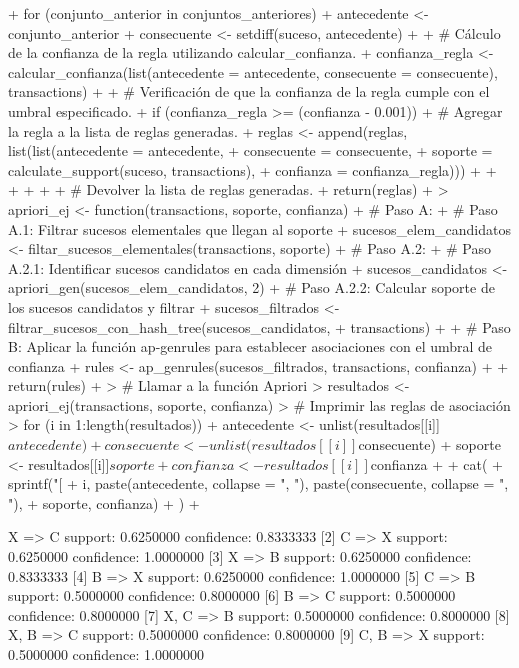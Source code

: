 \documentclass[a4paper, 12pt]{article}
\begin{document}
\begin{Schunk}
\begin{Sinput}
{{{+       for (conjunto_anterior in conjuntos_anteriores) {
+         antecedente <- conjunto_anterior
+         consecuente <- setdiff(suceso, antecedente)
+         
+         # Cálculo de la confianza de la regla utilizando calcular_confianza.
+         confianza_regla <- calcular_confianza(list(antecedente = antecedente, consecuente = consecuente), transactions)
+         
+         # Verificación de que la confianza de la regla cumple con el umbral especificado.
+         if (confianza_regla >= (confianza - 0.001)) {
+           # Agregar la regla a la lista de reglas generadas.
+           reglas <- append(reglas, list(list(antecedente = antecedente,
+                                              consecuente = consecuente,
+                                              soporte = calculate_support(suceso, transactions),
+                                              confianza = confianza_regla)))
+         }
+       }
+     }
+   }
+   
+   # Devolver la lista de reglas generadas.
+   return(reglas)
+ }
> apriori_ej <- function(transactions, soporte, confianza) {
+ 	# Paso A:
+ 	# Paso A.1: Filtrar sucesos elementales que llegan al soporte
+ 	sucesos_elem_candidatos <- filtar_sucesos_elementales(transactions, soporte)
+ 	# Paso A.2:
+ 		# Paso A.2.1: Identificar sucesos candidatos en cada dimensión
+ 		sucesos_candidatos <- apriori_gen(sucesos_elem_candidatos, 2)
+ 		# Paso A.2.2: Calcular soporte de los sucesos candidatos y filtrar
+ 		sucesos_filtrados <- filtrar_sucesos_con_hash_tree(sucesos_candidatos,
+ 		transactions)
+ 
+ 	# Paso B: Aplicar la función ap-genrules para establecer asociaciones con el umbral de confianza
+ 	rules <- ap_genrules(sucesos_filtrados, transactions, confianza)
+ 
+ 	return(rules)
+ }
> # Llamar a la función Apriori
> resultados <- apriori_ej(transactions, soporte, confianza)
> # Imprimir las reglas de asociación
> for (i in 1:length(resultados)) {
+ 	antecedente <- unlist(resultados[[i]]$antecedente)
+ 	consecuente <- unlist(resultados[[i]]$consecuente)
+ 	soporte <- resultados[[i]]$soporte
+ 	confianza <- resultados[[i]]$confianza
+ 	
+ 	cat(
+ 	sprintf("[%
+ 			i, paste(antecedente, collapse = ", "), paste(consecuente, collapse = ", "),
+ 			soporte, confianza)
+ 	)
+ }
\end{Sinput}
\begin{Soutput}
[1] {X} => {C}  support: 0.6250000  confidence: 0.8333333
[2] {C} => {X}  support: 0.6250000  confidence: 1.0000000
[3] {X} => {B}  support: 0.6250000  confidence: 0.8333333
[4] {B} => {X}  support: 0.6250000  confidence: 1.0000000
[5] {C} => {B}  support: 0.5000000  confidence: 0.8000000
[6] {B} => {C}  support: 0.5000000  confidence: 0.8000000
[7] {X, C} => {B}  support: 0.5000000  confidence: 0.8000000
[8] {X, B} => {C}  support: 0.5000000  confidence: 0.8000000
[9] {C, B} => {X}  support: 0.5000000  confidence: 1.0000000
\end{Soutput}
\end{Schunk}
\end{document}

